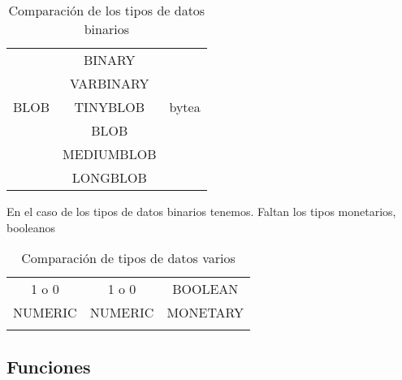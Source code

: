 \begin{table}[h]
\begin{center}
\begin{tabular}{|c|c|c|}
\hline \s & \m & \p \\ 
\hline  & BINARY &  \\  
 & VARBINARY &  \\ 
 BLOB & TINYBLOB & bytea \\ 
 & BLOB &  \\ 
 & MEDIUMBLOB &  \\
& LONGBLOB &  \\ 
\hline 
\end{tabular} 
\end{center}
\caption{Comparación de los tipos de datos binarios}
\end{table}

En el caso de los tipos de datos binarios tenemos.
Faltan los tipos monetarios, booleanos

\begin{table}[h]
\begin{center}
\begin{tabular}{|c|c|c|}
\hline \s & \m & \p \\ 
\hline 1 o 0 & 1 o 0 & BOOLEAN \\  
\hline NUMERIC & NUMERIC & MONETARY \\  
&  &  \\  
\hline 
\end{tabular} 
\end{center}
\caption{Comparación de tipos de datos varios}
\end{table}

\subsection{Funciones}





